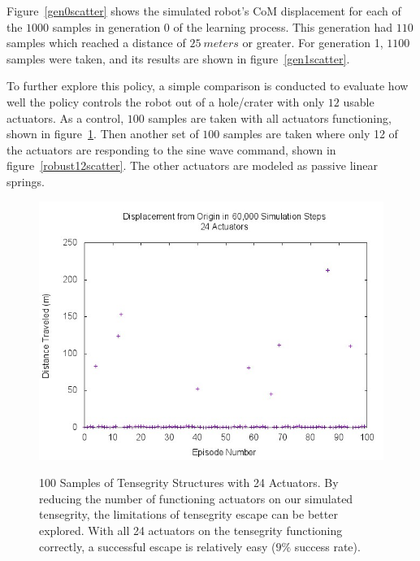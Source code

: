 Figure~\ref{gen0scatter} shows the simulated robot's CoM displacement for each of the \(1000\) samples in generation 0 of the learning process.
This generation had \(110\) samples which reached a distance of \(\SI{25}{meters}\) or greater.
For generation 1, \(1100\) samples were taken, and its results are shown in figure~\ref{gen1scatter}.

To further explore this policy, a simple comparison is conducted to evaluate how well the policy controls the robot out of a hole/crater with only \(12\) usable actuators.
As a control, \(100\) samples are taken with all actuators functioning, shown in figure~\ref{robust24scatter}.
Then another set of \(100\) samples are taken where only 12 of the actuators are responding to the sine wave command, shown in figure~\ref{robust12scatter}.
The other actuators are modeled as passive linear springs.

\begin{figure}[thpb]
\centering
{\includegraphics[width=0.8\linewidth]{tex/ARMS_2015/Pictures/dists100.jpg}} 
\caption{100 Samples of Tensegrity Structures with 24 Actuators. By reducing the number of functioning actuators on our simulated tensegrity, the limitations of tensegrity escape can be better explored.
With all 24 actuators on the tensegrity functioning correctly, a successful escape is relatively easy ($9\%$ success rate).}
\label{robust24scatter}
\end{figure}
                       
